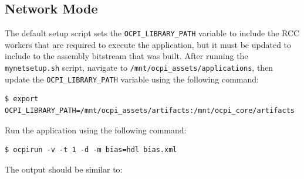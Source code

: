 \subsection{Network Mode}
 \label{sec:ocpirun_net}
The default setup script sets the \texttt{OCPI\_LIBRARY\_PATH} variable to include the RCC workers that are required to execute the application, but it must be updated to include to the assembly bitstream that was built.  After running the \texttt{mynetsetup.sh} script, navigate to  \texttt{/mnt/ocpi\_assets/applications}, then update the \texttt{OCPI\_LIBRARY\_PATH} variable using the following command:
\begin{verbatim}
$ export OCPI_LIBRARY_PATH=/mnt/ocpi_assets/artifacts:/mnt/ocpi_core/artifacts
\end{verbatim}
Run the application using the following command:
\begin{verbatim}
$ ocpirun -v -t 1 -d -m bias=hdl bias.xml
\end{verbatim}
The output should be similar to:
